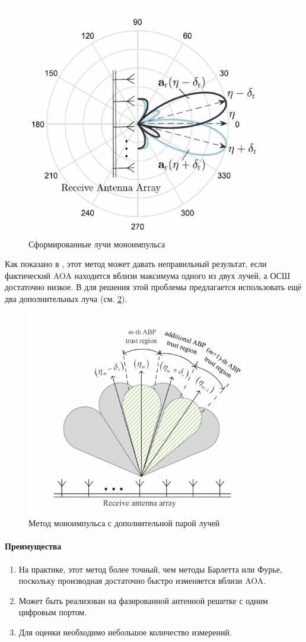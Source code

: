 \begin{figure}[h]
    \centering
    \includegraphics[width=0.45\linewidth]{figs/fig3.13}
    \caption{Сформированные лучи моноимпульса \cite{Zhu2016}}
    \label{fig:}
\end{figure}

Как показано в  \cite{Sherman2011},
этот метод может давать неправильный результат, если фактический AOA
находится вблизи максимума одного из двух лучей, а ОСШ достаточно низкое. 
В \cite{Sherman2011} для решения этой проблемы предлагается использовать ещё два дополнительных луча (см. \ref{fig:3.14}).

\begin{figure}[h]
    \centering
    \includegraphics[width=0.6\linewidth]{figs/fig3.14}
    \caption{Метод моноимпульса с дополнительной парой лучей \cite{Tuncer2009}}
    \label{fig:3.14}
\end{figure}

\paragraph{Преимущества}%
\label{par:preimushchestva}

\begin{enumerate}
    \item На практике, этот метод более точный, чем методы Барлетта или Фурье, поскольку производная достаточно быстро изменяется вблизи AOA.
    \item Может быть реализован на фазированной антенной решетке с одним цифровым портом.
    \item Для оценки необходимо небольшое количество измерений. 
\end{enumerate}

